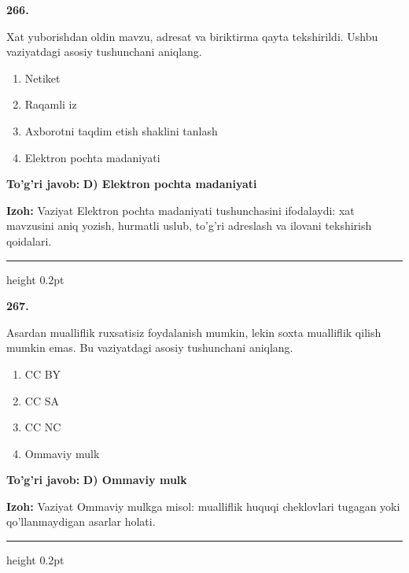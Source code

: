 \documentclass[10pt,a4paper,oneside]{article}
\begin{document}
\noindent\textbf{\color{ink}266.}
\par
Xat yuborishdan oldin mavzu, adresat va biriktirma qayta tekshirildi. Ushbu vaziyatdagi asosiy tushunchani aniqlang.
\begin{enumerate}[label=\Alph*),leftmargin=9mm]
\item Netiket
\item Raqamli iz
\item Axborotni taqdim etish shaklini tanlash
\item Elektron pochta madaniyati
\end{enumerate}
\begin{tcolorbox}[enhanced,breakable,colback=teal!4,colframe=teal!50!black,boxrule=0.5pt,arc=1.1mm,left=3mm,right=3mm,top=1.7mm,bottom=1.7mm,before skip=2mm,after skip=2mm]
\textbf{\color{teal}To'g'ri javob:} \textbf{D) Elektron pochta madaniyati}
\par\smallskip
\textbf{Izoh:} Vaziyat Elektron pochta madaniyati tushunchasini ifodalaydi: xat mavzusini aniq yozish, hurmatli uslub, to'g'ri adreslash va ilovani tekshirish qoidalari.
\end{tcolorbox}
\vspace{2mm}\hrule height 0.2pt \vspace{3mm}

\noindent\textbf{\color{ink}267.}
\par
Asardan mualliflik ruxsatisiz foydalanish mumkin, lekin soxta mualliflik qilish mumkin emas. Bu vaziyatdagi asosiy tushunchani aniqlang.
\begin{enumerate}[label=\Alph*),leftmargin=9mm]
\item CC BY
\item CC SA
\item CC NC
\item Ommaviy mulk
\end{enumerate}
\begin{tcolorbox}[enhanced,breakable,colback=teal!4,colframe=teal!50!black,boxrule=0.5pt,arc=1.1mm,left=3mm,right=3mm,top=1.7mm,bottom=1.7mm,before skip=2mm,after skip=2mm]
\textbf{\color{teal}To'g'ri javob:} \textbf{D) Ommaviy mulk}
\par\smallskip
\textbf{Izoh:} Vaziyat Ommaviy mulkga misol: mualliflik huquqi cheklovlari tugagan yoki qo'llanmaydigan asarlar holati.
\end{tcolorbox}
\vspace{2mm}\hrule height 0.2pt \vspace{3mm}
\end{document}
